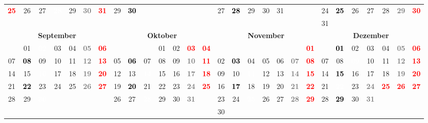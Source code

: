 \documentclass[10pt,a4paper,landscape]{article}
\newcommand{\yb}[1]{\cellcolor{yellow}\textcolor{black}{\bf #1}}
\newcommand{\iv}[1]{\cellcolor{black}\textcolor{white}{\bf #1}}
\newcommand{\rb}[1]{\textbf{\textcolor{red}{#1}}}
\newcommand{\hv}[1]{\textbf{\textcolor{Gray}{#1}}}
\begin{document}
\begin{tabular}{|ccccccc|ccccccc|ccccccc|ccccccc|}
\rb{25} & 26 & 27 & \iv{28} & 29 & \hv{30} & \rb{31} & 29 & \yb{30} & & & & & & 27 & \yb{28} & 29 & 30 & 31 & & & 24 & \yb{25} & 26 & 27 & 28 & \hv{29} & \rb{30} \\
& & & & & & & & & & & & & & & & & & & & & 31 & & & & & &  \\
\hline
\multicolumn{7}{|c|}{\bf September} & \multicolumn{7}{|c|}{\bf Oktober} & \multicolumn{7}{|c|}{\bf November} & \multicolumn{7}{|c|}{\bf Dezember} \\
& 01 & \iv{02} & 03 & 04 & \hv{05} & \rb{06} & & & & 01 & 02 & \rb{03} & \rb{04} & & & & & & & \rb{01} & & \yb{01} & 02 & 03 & 04 & \hv{05} & \rb{06} \\
07 & \yb{08} & 09 & 10 & 11 & \hv{12} & \rb{13} & 05 & \yb{06} & 07 & 08 & 09 & \hv{10} & \rb{11} & 02 & \yb{03} & 04 & 05 & 06 & \hv{07} & \rb{08} & 07 & 08 & \iv{09} & 10 & 11 & \hv{12} & \rb{13} \\
14 & 15 & \iv{16} & 17 & 18 & \hv{19} & \rb{20} & 12 & 13 & \iv{14} & 15 & 16 & \hv{17} & \rb{18} & 09 & 10 & \iv{11} & 12 & 13 & \hv{14} & \rb{15} & 14 & \yb{15} & 16 & 17 & 18 & \hv{19} & \rb{20} \\
21 & \yb{22} & 23 & 24 & 25 & \hv{26} & \rb{27} & 19 & \yb{20} & 21 & 22 & 23 & \hv{24} & \rb{25} & 16 & \yb{17} & 18 & 19 & 20 & \hv{21} & \rb{22} & 21 & \iv{22} & 23 & \hv{24} & \rb{25} & \rb{26} & \rb{27} \\
28 & 29 & \iv{30} & & & & & 26 & 27 & \iv{28} & 29 & 30 & \hv{31} & & 23 & 24 & \iv{25} & 26 & 27 & \hv{28} & \rb{29} & 28 & \yb{29} & 30 & \hv{31} & & &  \\
& & & & & & & & & & & & & & 30 & & & & & & & & & & & & &  \\
\hline
\end{tabular}
\end{document}
